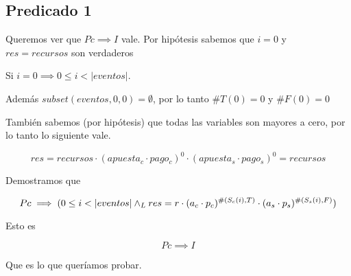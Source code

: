 \documentclass[../document.tex]{subfiles}
\begin{document}
\subsection*{Predicado 1}
Queremos ver que $Pc\implies I$ vale. Por hipótesis sabemos que $i=0$ y $res=recursos$ son verdaderos

Si $i=0 \implies 0\leq i < |eventos|$. 

Además $subset(eventos,0,0)=\emptyset$, por lo tanto $\#T(0)=0$ y $\#F(0)=0$

También sabemos (por hipótesis) que todas las variables son mayores a cero, por lo tanto lo siguiente vale.

\begin{equation}
res=recursos\cdot(apuesta_c\cdot pago_c)^0\cdot (apuesta_s\cdot pago_s)^0=recursos
\end{equation}

Demostramos que

\begin{equation}
Pc\implies (0\leq i < |eventos| \land _L res=r\cdot(a_c\cdot p_c)^{\#(S_c(i),T)}\cdot(a_s\cdot p_s)^{\#(S_s(i),F)})
\end{equation}

Esto es

\begin{equation}
Pc\implies I
\end{equation}

Que es lo que queríamos probar.








\end{document}
